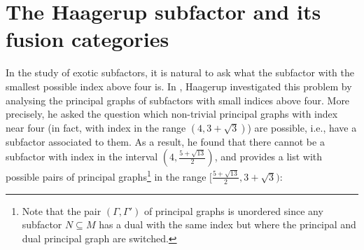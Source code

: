 \chapter{The Haagerup subfactor and its fusion categories}
\label{ch:Haagerup}

In the study of exotic subfactors, it is natural to ask what the subfactor with the smallest possible index above four is. In \cite{Haagerup1994}, Haagerup investigated this problem by analysing the principal graphs of subfactors with small indices above four. More precisely, he asked the question which non-trivial principal graphs with index near four (in fact, with index in the range $(4,3+\sqrt{3})$) are possible, i.e., have a subfactor associated to them. As a result, he found that there cannot be a subfactor with index in the interval $(4,\frac{5+\sqrt{13}}{2})$, and provides a list with possible pairs of principal graphs\footnote{Note that the pair $(\Gamma,\Gamma')$ of principal graphs is unordered since any subfactor $N\subseteq M$ has a dual with the same index but where the principal and dual principal graph are switched.} in the range $[\frac{5+\sqrt{13}}{2},3+\sqrt{3})$:
